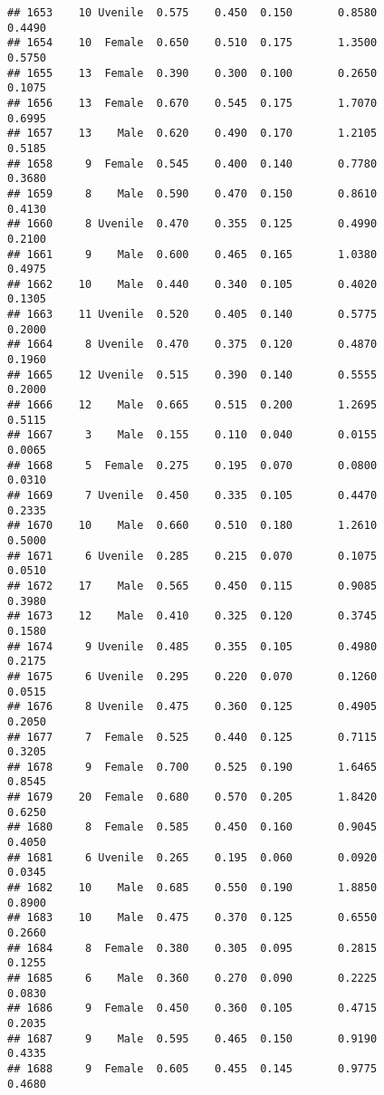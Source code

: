 \documentclass[
]{article}
\begin{document}
\begin{verbatim}
## 1653    10 Uvenile  0.575    0.450  0.150       0.8580         0.4490
## 1654    10  Female  0.650    0.510  0.175       1.3500         0.5750
## 1655    13  Female  0.390    0.300  0.100       0.2650         0.1075
## 1656    13  Female  0.670    0.545  0.175       1.7070         0.6995
## 1657    13    Male  0.620    0.490  0.170       1.2105         0.5185
## 1658     9  Female  0.545    0.400  0.140       0.7780         0.3680
## 1659     8    Male  0.590    0.470  0.150       0.8610         0.4130
## 1660     8 Uvenile  0.470    0.355  0.125       0.4990         0.2100
## 1661     9    Male  0.600    0.465  0.165       1.0380         0.4975
## 1662    10    Male  0.440    0.340  0.105       0.4020         0.1305
## 1663    11 Uvenile  0.520    0.405  0.140       0.5775         0.2000
## 1664     8 Uvenile  0.470    0.375  0.120       0.4870         0.1960
## 1665    12 Uvenile  0.515    0.390  0.140       0.5555         0.2000
## 1666    12    Male  0.665    0.515  0.200       1.2695         0.5115
## 1667     3    Male  0.155    0.110  0.040       0.0155         0.0065
## 1668     5  Female  0.275    0.195  0.070       0.0800         0.0310
## 1669     7 Uvenile  0.450    0.335  0.105       0.4470         0.2335
## 1670    10    Male  0.660    0.510  0.180       1.2610         0.5000
## 1671     6 Uvenile  0.285    0.215  0.070       0.1075         0.0510
## 1672    17    Male  0.565    0.450  0.115       0.9085         0.3980
## 1673    12    Male  0.410    0.325  0.120       0.3745         0.1580
## 1674     9 Uvenile  0.485    0.355  0.105       0.4980         0.2175
## 1675     6 Uvenile  0.295    0.220  0.070       0.1260         0.0515
## 1676     8 Uvenile  0.475    0.360  0.125       0.4905         0.2050
## 1677     7  Female  0.525    0.440  0.125       0.7115         0.3205
## 1678     9  Female  0.700    0.525  0.190       1.6465         0.8545
## 1679    20  Female  0.680    0.570  0.205       1.8420         0.6250
## 1680     8  Female  0.585    0.450  0.160       0.9045         0.4050
## 1681     6 Uvenile  0.265    0.195  0.060       0.0920         0.0345
## 1682    10    Male  0.685    0.550  0.190       1.8850         0.8900
## 1683    10    Male  0.475    0.370  0.125       0.6550         0.2660
## 1684     8  Female  0.380    0.305  0.095       0.2815         0.1255
## 1685     6    Male  0.360    0.270  0.090       0.2225         0.0830
## 1686     9  Female  0.450    0.360  0.105       0.4715         0.2035
## 1687     9    Male  0.595    0.465  0.150       0.9190         0.4335
## 1688     9  Female  0.605    0.455  0.145       0.9775         0.4680

\end{verbatim}
\end{document}
